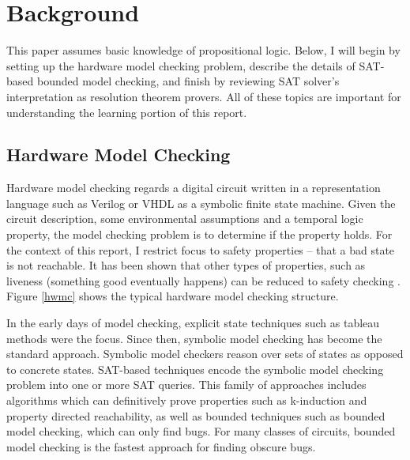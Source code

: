 \documentclass[letterpaper]{article} %
\begin{document}
\section{Background}
This paper assumes basic knowledge of propositional logic. Below, I will begin by setting up the hardware model checking problem, describe the details of SAT-based bounded model checking, and finish by reviewing SAT solver's interpretation as resolution theorem provers. All of these topics are important for understanding the learning portion of this report.

\subsection{Hardware Model Checking}
Hardware model checking regards a digital circuit written in a representation language such as Verilog or VHDL as a symbolic finite state machine. Given the circuit description, some environmental assumptions and a temporal logic property, the model checking problem is to determine if the property holds. For the context of this report, I restrict focus to safety properties -- that a bad state is not reachable. It has been shown that other types of properties, such as liveness (something good eventually happens) can be reduced to safety checking \cite{biere}. Figure \ref{hwmc} shows the typical hardware model checking structure.

In the early days of model checking, explicit state techniques such as tableau methods were the focus. Since then, symbolic model checking has become the standard approach. Symbolic model checkers reason over sets of states as opposed to concrete states. SAT-based techniques encode the symbolic model checking problem into one or more SAT queries. This family of approaches includes algorithms which can definitively prove properties such as k-induction and property directed reachability, as well as bounded techniques such as bounded model checking, which can only find bugs. For many classes of circuits, bounded model checking is the fastest approach for finding obscure bugs.
\end{document}

